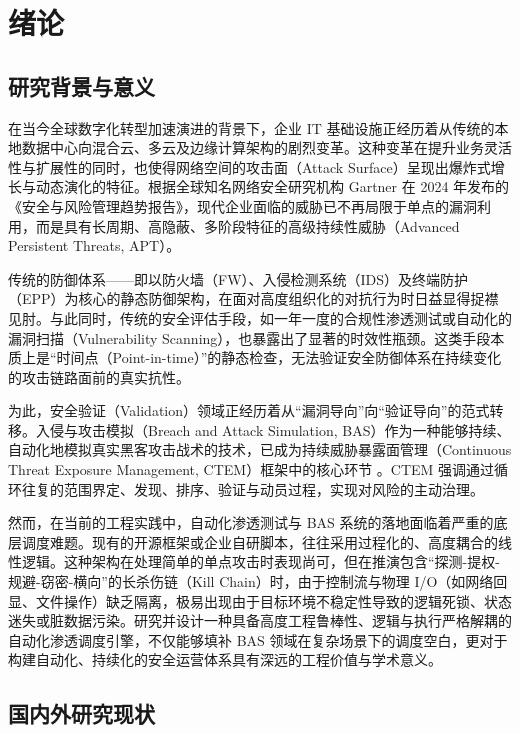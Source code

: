 \documentclass[twoside,openright]{xduugthesis}
\begin{document}
\chapter{绪论}

\section{研究背景与意义}

在当今全球数字化转型加速演进的背景下，企业 IT 基础设施正经历着从传统的本地数据中心向混合云、多云及边缘计算架构的剧烈变革。这种变革在提升业务灵活性与扩展性的同时，也使得网络空间的攻击面（Attack Surface）呈现出爆炸式增长与动态演化的特征。根据全球知名网络安全研究机构 Gartner 在 2024 年发布的《安全与风险管理趋势报告》，现代企业面临的威胁已不再局限于单点的漏洞利用，而是具有长周期、高隐蔽、多阶段特征的高级持续性威胁（Advanced Persistent Threats, APT）\cite{gartner2024ctem}。

传统的防御体系——即以防火墙（FW）、入侵检测系统（IDS）及终端防护（EPP）为核心的静态防御架构，在面对高度组织化的对抗行为时日益显得捉襟见肘。与此同时，传统的安全评估手段，如一年一度的合规性渗透测试或自动化的漏洞扫描（Vulnerability Scanning），也暴露出了显著的时效性瓶颈。这类手段本质上是“时间点（Point-in-time）”的静态检查，无法验证安全防御体系在持续变化的攻击链路面前的真实抗性。

为此，安全验证（Validation）领域正经历着从“漏洞导向”向“验证导向”的范式转移。入侵与攻击模拟（Breach and Attack Simulation, BAS）作为一种能够持续、自动化地模拟真实黑客攻击战术的技术，已成为持续威胁暴露面管理（Continuous Threat Exposure Management, CTEM）框架中的核心环节 \cite{crowdstrike2024bas}。CTEM 强调通过循环往复的范围界定、发现、排序、验证与动员过程，实现对风险的主动治理。

然而，在当前的工程实践中，自动化渗透测试与 BAS 系统的落地面临着严重的底层调度难题。现有的开源框架或企业自研脚本，往往采用过程化的、高度耦合的线性逻辑。这种架构在处理简单的单点攻击时表现尚可，但在推演包含“探测-提权-规避-窃密-横向”的长杀伤链（Kill Chain）时，由于控制流与物理 I/O（如网络回显、文件操作）缺乏隔离，极易出现由于目标环境不稳定性导致的逻辑死锁、状态迷失或脏数据污染。研究并设计一种具备高度工程鲁棒性、逻辑与执行严格解耦的自动化渗透调度引擎，不仅能够填补 BAS 领域在复杂场景下的调度空白，更对于构建自动化、持续化的安全运营体系具有深远的工程价值与学术意义。

\section{国内外研究现状}
\end{document}
